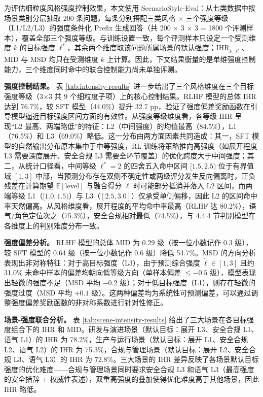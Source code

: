 \documentclass[fontset=fandol,type=master,campus=shenzhen,etitleauto=true]{hithesisbook}
\begin{document}
为评估细粒度风格强度控制效果，本文使用 ScenarioStyle-Eval：从七类数据中按场景类别分层抽取 200 条问题，每条分别搭配三类风格 × 三个强度等级（L1/L2/L3）的强度条件化 Prefix 生成回答（共 200 × 3 × 3 = 1800 个评测样本），覆盖全部三个强度等级。与训练设置一致，每个评测样本只设定一个受测维度 $k$ 的目标强度 $\ell^*$，其余两个维度取该问题所属场景的默认强度；$\text{IHR}_{k,\ell^*}$、MID 与 MSD 均只在受测维度 $k$ 上计算。因此，下文结果衡量的是单维强度控制能力，三个维度同时命中的联合控制能力尚未单独评测。

\textbf{强度控制结果。} 表 \ref{tab:intensity-results} 进一步给出了三个风格维度在三个目标强度等级（3×3 共 9 个细粒度子项）上的核心控制结果。RLHF 模型的总体 IHR 达到 76.7\%，较 SFT 模型（44.0\%）提升 32.7 pp，验证了强度偏差奖励函数在引导模型逼近目标强度区间方面的有效性。从强度等级维度看，各等级 IHR 呈现``L2 最高、两端略低''的特征：L2（中间强度）的均值最高（84.5\%），L1（76.5\%）和 L3（69.0\%）略低。这一分布由两方面因素共同造成：其一，SFT 模型的自然输出分布原本集中于中等强度，RL 训练将策略推向高强度（如展开程度 L3 需要深度展开、安全合规 L3 需要全环节覆盖）的优化跨度大于中间强度；其二，从统计口径看，中间等级 $\ell^*=2$ 的四舍五入命中区间 $[1.5, 2.5)$ 位于有界值域 $[1,3]$ 中部，当预测分布存在双侧不确定性或两级评分发生反向偏离时，正负残差在计算期望 $\mathbb{E}[\text{level}]$ 与融合得分 $\tilde{\ell}$ 时可能部分抵消并落入 L2 区间，而两端等级 L1（$[1.0, 1.5)$）与 L3（$[2.5, 3.0]$）仅承受单侧偏移，因此 L2 的区间命中率天然偏高。从风格维度看，展开程度的平均命中率最高（RLHF 达 80.2\%），语气/角色定位次之（75.3\%），安全合规相对最低（74.5\%），与 4.4.4 节判别模型在各维度上的判别难度分布一致。

\textbf{强度偏差分析。} RLHF 模型的总体 MID 为 0.29 级（按一位小数记作 0.3 级），较 SFT 模型的 0.64 级（按一位小数记作 0.6 级）降低 54.7\%。MSD 的方向分析表现出非对称特征：对于高目标强度（L3），由于预测综合强度 $\tilde{\ell} \in [1,3]$ 且约 31.0\% 未命中样本的偏差均朝向低等级方向（单样本偏差 $\le -0.5$ 级），模型表现出轻微的强度不足（MSD 平均 $-0.2$ 级）；对于低目标强度（L1），则存在轻微的强度过度（MSD 平均 $+0.1$ 级）。这两种偏差均为系统性可预测偏差，可以通过调整强度偏差奖励函数的非对称系数进行针对性修正。

\textbf{场景-强度联合分析。} 表 \ref{tab:scene-intensity-results} 给出了三大场景在各目标强度组合下的 IHR 和 MID。研发与演进场景（默认目标：展开 L3、安全合规 L1、语气 L1）的 IHR 为 78.2\%，生产与运行场景（默认目标：展开 L1、安全合规 L2、语气 L2）的 IHR 为 75.3\%，合规与管理场景（默认目标：展开 L2、安全合规 L3、语气 L3）的 IHR 为 72.8\%。三大场景的 IHR 差异反映了各场景默认目标强度的优化难度------合规与管理场景同时要求安全合规 L3 和语气 L3（最高强度的安全措辞 + 权威性表述），双重高强度的叠加使得优化难度高于其他场景，因此 IHR 略低。
\end{document}
